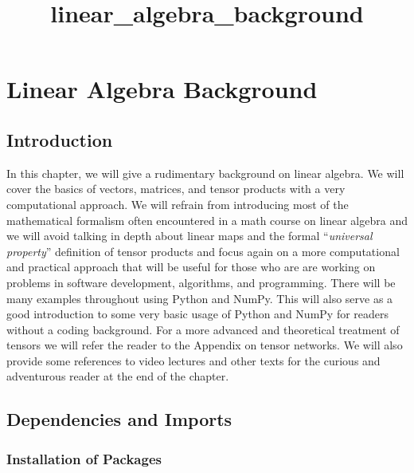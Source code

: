 \documentclass[11pt]{article}
\title{linear\_algebra\_background}
\begin{document}
    
    
    \maketitle
    
    

    
    \hypertarget{linear-algebra-background}{%
\section{Linear Algebra Background}\label{linear-algebra-background}}

    \hypertarget{introduction}{%
\subsection{Introduction}\label{introduction}}

In this chapter, we will give a rudimentary background on linear
algebra. We will cover the basics of vectors, matrices, and tensor
products with a very computational approach. We will refrain from
introducing most of the mathematical formalism often encountered in a
math course on linear algebra and we will avoid talking in depth about
linear maps and the formal ``\emph{universal property}'' definition of
tensor products and focus again on a more computational and practical
approach that will be useful for those who are are working on problems
in software development, algorithms, and programming. There will be many
examples throughout using Python and NumPy. This will also serve as a
good introduction to some very basic usage of Python and NumPy for
readers without a coding background. For a more advanced and theoretical
treatment of tensors we will refer the reader to the Appendix on tensor
networks. We will also provide some references to video lectures and
other texts for the curious and adventurous reader at the end of the
chapter.

    \hypertarget{dependencies-and-imports}{%
\subsection{Dependencies and Imports}\label{dependencies-and-imports}}

\hypertarget{installation-of-packages}{%
\subsubsection{Installation of
Packages}\label{installation-of-packages}}
\end{document}
